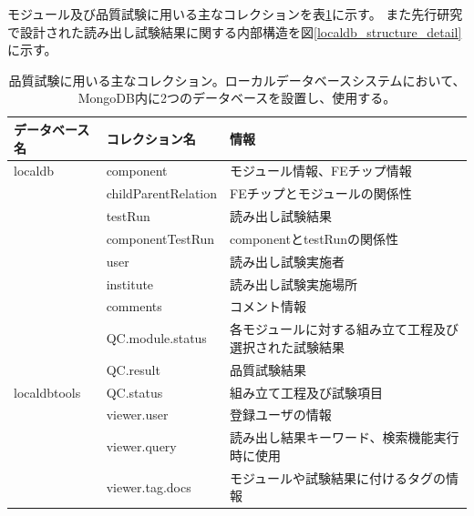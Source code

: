 モジュール及び品質試験に用いる主なコレクションを表\ref{localdb_structure}に示す。
また先行研究で設計された読み出し試験結果に関する内部構造を図\ref{localdb_structure_detail}に示す。

\begin{table}[btp]
\begin{center}
\caption[品質試験に用いる主なコレクション]{品質試験に用いる主なコレクション。ローカルデータベースシステムにおいて、MongoDB内に2つのデータベースを設置し、使用する。}
\label{localdb_structure}
  \small
  \begin{tabular}{|lll|} \hline
    データベース名 & コレクション名 & 情報 \\ \hline
    localdb      & component & モジュール情報、FEチップ情報 \\ 
                 & childParentRelation & FEチップとモジュールの関係性 \\ 
                 & testRun & 読み出し試験結果 \\ 
                 & componentTestRun & componentとtestRunの関係性 \\
                 & user & 読み出し試験実施者 \\
                 & institute & 読み出し試験実施場所 \\
                 & comments & コメント情報 \\
                 & QC.module.status & 各モジュールに対する組み立て工程及び選択された試験結果 \\ 
                 & QC.result & 品質試験結果 \\ \hline 
    localdbtools & QC.status & 組み立て工程及び試験項目\\
                 & viewer.user & 登録ユーザの情報 \\
                 & viewer.query & 読み出し結果キーワード、検索機能実行時に使用 \\ 
                 & viewer.tag.docs & モジュールや試験結果に付けるタグの情報 \\ \hline
  \end{tabular}
\end{center}
\end{table}

